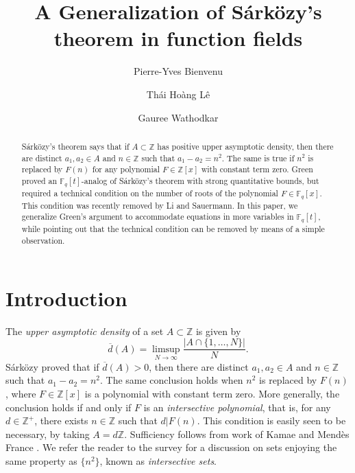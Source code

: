 \documentclass[11pt]{amsart}
\newcommand{\Z}{\mathbb{Z}}
\newcommand\Fq{{\mathbb{F}_q}}
\theoremstyle{definition}
\theoremstyle{remark}
\begin{document}
    \author{Pierre-Yves Bienvenu}
    \address{Johann Radon Institute for Computational and Applied Mathematics, Austrian 
Academy of Sciences, Linz, Austria}

		\author{Th\'ai Ho\`ang L\^e}
	
		\address{Department of Mathematics\\
				University of Mississippi\\
				University, MS 38677, USA}
		
		        \author{Gauree Wathodkar}
				\address{Department of Mathematics and Statistics\\
				Loyola University Chicago\\
				1032 W. Sheridan Road, Chicago, IL 60660, USA}

	
\title{A Generalization of S\'ark\"ozy's theorem in function fields}
\begin{abstract}
S\'ark\"ozy's theorem says that if $A \subset \mathbb{Z}$ has positive upper asymptotic density, then there are distinct $a_1, a_2 \in A$ and $n \in \Z$ such that $a_1-a_2 = n^2$. The same is true if $n^2$ is replaced by $F(n)$ for any polynomial $F \in \Z[x]$ with constant term zero. Green proved an $\mathbb{F}_q[t]$-analog of S\'ark\"ozy's theorem with strong quantitative bounds, but required a technical condition on the number of roots of the polynomial $F \in \Fq[x]$. This condition was recently removed by Li and Sauermann. In this paper, we generalize Green's argument to accommodate equations in more variables in $\Fq[t]$, while pointing out that the technical condition can be removed by means of a simple observation.
\end{abstract}	
\maketitle
\section{Introduction}
The \textit{upper asymptotic density} of a set $A \subset \mathbb{Z}$ is given by 
\begin{equation*}
    \overline{d}(A)=\limsup_{N\rightarrow \infty} \frac{|A\cap \{1,\dots,N\}|}{N}.
\end{equation*}
S\'ark\"ozy \cite{sar} proved that if $\overline{d}(A) > 0$, then there are distinct $a_1, a_2 \in A$ and $n \in \Z$ such that $a_1-a_2 =n^2$. The same conclusion holds when $n^2$ is replaced by $F(n)$, where $F \in \Z[x]$ is a polynomial with constant term zero. More generally, the conclusion holds if and only if $F$ is an \textit{intersective polynomial}, that is, for any $d \in \Z^+$, there exists $n \in \Z$ such that $d| F(n)$. This condition is easily seen to be necessary, by taking $A = d\Z$. Sufficiency follows from work of Kamae and Mend\`es France \cite{km}. We refer the reader to the survey \cite{le-survey} for a discussion on sets enjoying the same property as $\{ n^2 \}$, known as \textit{intersective sets}. 
\end{document}
